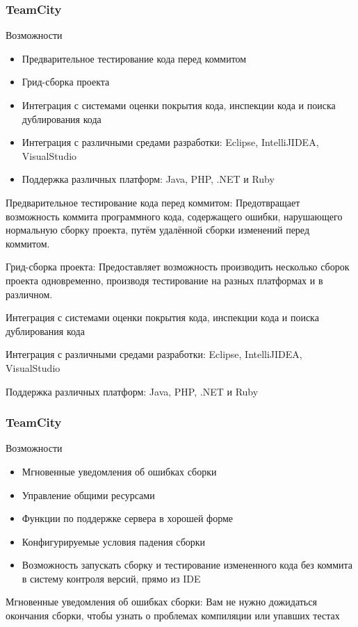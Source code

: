 \documentclass{../industrial-development}
\begin{document}
\begin{frame} \frametitle{TeamCity}
	\begin{block}{Возможности}
		\begin{itemize}
			\item Предварительное тестирование кода перед коммитом
			\item Грид-сборка проекта
			\item Интеграция с системами оценки покрытия кода, инспекции кода и поиска дублирования кода
			\item Интеграция с различными средами разработки: Eclipse, IntelliJIDEA, VisualStudio
			\item Поддержка различных платформ: Java, PHP, .NET и Ruby
		\end{itemize}
	\end{block}
\end{frame}
\lecturenotes
Предварительное тестирование кода перед коммитом:
Предотвращает возможность коммита программного кода, содержащего ошибки, нарушающего нормальную сборку проекта, путём удалённой сборки изменений перед коммитом.

Грид-сборка проекта:
Предоставляет возможность производить несколько сборок проекта одновременно, производя тестирование на разных платформах и в различном.

Интеграция с системами оценки покрытия кода, инспекции кода и поиска дублирования кода

Интеграция с различными средами разработки: Eclipse, IntelliJIDEA, VisualStudio

Поддержка различных платформ: Java, PHP, .NET и Ruby

\begin{frame} \frametitle{TeamCity}
	\begin{block}{Возможности}
		\begin{itemize}
			\item Мгновенные уведомления об ошибках сборки
			\item Управление общими ресурсами
			\item Функции по поддержке сервера в хорошей форме
			\item Конфигурируемые условия падения сборки
			\item Возможность запускать сборку и тестирование измененного кода без коммита в систему контроля версий, прямо из IDE
		\end{itemize}	
	\end{block}
\end{frame}
\lecturenotes
Мгновенные уведомления об ошибках сборки:
Вам не нужно дожидаться окончания сборки, чтобы узнать о проблемах компиляции или упавших тестах
\end{document}
